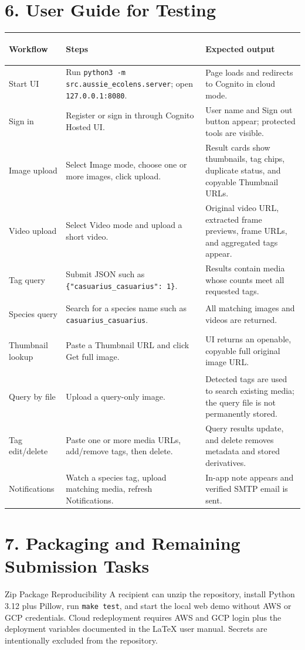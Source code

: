 \documentclass[12pt,a4paper]{article}
\begin{document}
\section*{6. User Guide for Testing}
\small
\begin{tabularx}{\textwidth}{>{\bfseries\raggedright\arraybackslash}p{31mm}X>{\raggedright\arraybackslash}p{54mm}}
\toprule
\textbf{Workflow} & \textbf{Steps} & \textbf{Expected output}\\
\midrule
Start UI & Run \texttt{python3 -m src.aussie\_ecolens.server}; open \texttt{127.0.0.1:8080}. & Page loads and redirects to Cognito in cloud mode.\\
Sign in & Register or sign in through Cognito Hosted UI. & User name and Sign out button appear; protected tools are visible.\\
Image upload & Select Image mode, choose one or more images, click upload. & Result cards show thumbnails, tag chips, duplicate status, and copyable Thumbnail URLs.\\
Video upload & Select Video mode and upload a short video. & Original video URL, extracted frame previews, frame URLs, and aggregated tags appear.\\
Tag query & Submit JSON such as \texttt{\{"casuarius\_casuarius": 1\}}. & Results contain media whose counts meet all requested tags.\\
Species query & Search for a species name such as \texttt{casuarius\_casuarius}. & All matching images and videos are returned.\\
Thumbnail lookup & Paste a Thumbnail URL and click Get full image. & UI returns an openable, copyable full original image URL.\\
Query by file & Upload a query-only image. & Detected tags are used to search existing media; the query file is not permanently stored.\\
Tag edit/delete & Paste one or more media URLs, add/remove tags, then delete. & Query results update, and delete removes metadata and stored derivatives.\\
Notifications & Watch a species tag, upload matching media, refresh Notifications. & In-app note appears and verified SMTP email is sent.\\
\bottomrule
\end{tabularx}
\normalsize

\section*{7. Packaging and Remaining Submission Tasks}
\begin{summarybox}{Zip Package Reproducibility}
A recipient can unzip the repository, install Python 3.12 plus Pillow, run \texttt{make test}, and start the local web demo without AWS or GCP credentials. Cloud redeployment requires AWS and GCP login plus the deployment variables documented in the LaTeX user manual. Secrets are intentionally excluded from the repository.
\end{summarybox}
\end{document}

